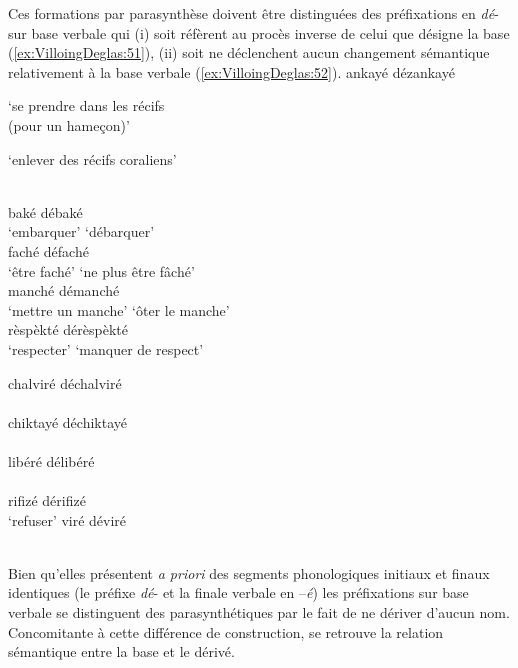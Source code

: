 \documentclass[output=paper]{langsci/langscibook}
\begin{document}
Ces formations par parasynthèse doivent être distinguées des
préfixations en \emph{dé}- sur base verbale qui (i) soit réfèrent au
procès inverse de celui que désigne la base (\ref{ex:VilloingDeglas:51}), (ii) soit ne
déclenchent aucun changement sémantique relativement à la base verbale
(\ref{ex:VilloingDeglas:52}).
\ea \label{ex:VilloingDeglas:51}
      \ea \gll ankayé  \textrightarrow{~} dézankayé\\
  {\begin{minipage}[t]{.4\textwidth}\raggedright `se prendre dans les récifs\\ (pour un hameçon)'\end{minipage}} {} {\begin{minipage}[t]{.3\textwidth}\raggedright `enlever des récifs coraliens'\end{minipage}}\\
      \ex \gll  baké \textrightarrow{~} débaké\\
        {`embarquer'} {} {`débarquer'}\\
      \ex \gll  faché \textrightarrow{~} défaché\\
        {`être faché'} {} {`ne plus être fâché'}\\
      \ex \gll  manché \textrightarrow{~} démanché\\
        {`mettre un manche'} {} {`ôter le manche'}\\
      \ex \gll  rèspèkté \textrightarrow{~} dérèspèkté\\
        {`respecter'} {} {`manquer de respect'}\\
      \z

\ex \label{ex:VilloingDeglas:52}
      \ea chalviré \textrightarrow{~} déchalviré\\
        \\
      \ex  chiktayé \textrightarrow{~} déchiktayé\\
        \\
      \ex  libéré \textrightarrow{~} délibéré\\
        \\
        \ex  rifizé \textrightarrow{~} dérifizé\\
         \glt `refuser'
      \ex  viré \textrightarrow{~} déviré\\
        \\
\z\z

Bien qu'elles présentent \emph{a priori} des segments phonologiques
initiaux et finaux identiques (le préfixe \emph{dé}- et la finale
verbale en --\emph{é}) les préfixations sur base verbale se distinguent
des parasynthétiques par le fait de ne dériver d'aucun nom. Concomitante
à cette différence de construction, se retrouve la relation sémantique
entre la base et le dérivé.
\end{document}
